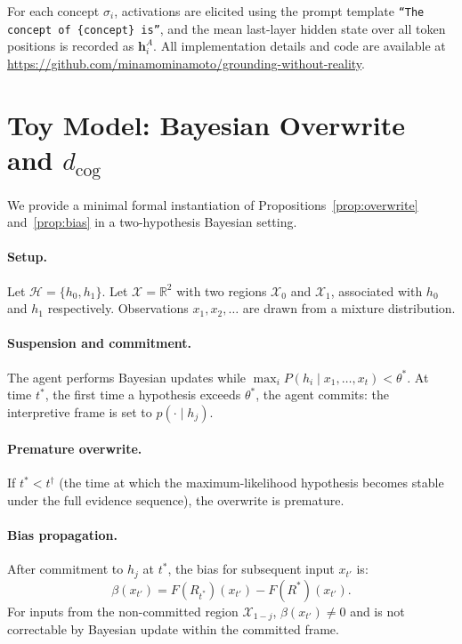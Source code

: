 \documentclass[12pt]{article}
\begin{document}
\noindent
For each concept $\sigma_i$, activations are elicited using the prompt
template \texttt{``The concept of \{concept\} is''}, and the mean
last-layer hidden state over all token positions is recorded as
$\mathbf{h}^A_i$.
All implementation details and code are available at
\url{https://github.com/minamominamoto/grounding-without-reality}.

\section{Toy Model: Bayesian Overwrite and $d_\mathrm{cog}$}
\label{app:toy-model}

We provide a minimal formal instantiation of Propositions~\ref{prop:overwrite}
and~\ref{prop:bias} in a two-hypothesis Bayesian setting.

\paragraph{Setup.}
Let $\mathcal{H} = \{h_0, h_1\}$.
Let $\mathcal{X} = \mathbb{R}^2$ with two regions $\mathcal{X}_0$
and $\mathcal{X}_1$, associated with $h_0$ and $h_1$ respectively.
Observations $x_1, x_2, \ldots$ are drawn from a mixture distribution.

\paragraph{Suspension and commitment.}
The agent performs Bayesian updates while
$\max_i P(h_i \mid x_1, \ldots, x_t) < \theta^*$.
At time $t^*$, the first time a hypothesis exceeds $\theta^*$, the
agent commits: the interpretive frame is set to $p(\cdot \mid h_j)$.

\paragraph{Premature overwrite.}
If $t^* < t^\dagger$ (the time at which the maximum-likelihood
hypothesis becomes stable under the full evidence sequence), the
overwrite is premature.

\paragraph{Bias propagation.}
After commitment to $h_j$ at $t^*$, the bias for subsequent input
$x_{t'}$ is:
\[
\beta(x_{t'}) = F(R_{t^*})(x_{t'}) - F(R^*)(x_{t'}).
\]
For inputs from the non-committed region $\mathcal{X}_{1-j}$,
$\beta(x_{t'}) \neq 0$ and is not correctable by Bayesian update
within the committed frame.
\end{document}
